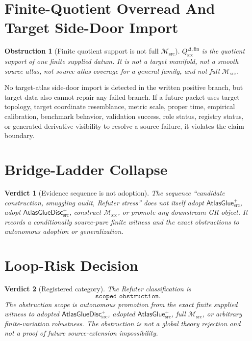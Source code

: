 \documentclass[11pt]{article}
\newcommand{\Msrc}{\mathcal{M}_{\mathrm{src}}}
\newcommand{\AtlasGlue}{\mathsf{AtlasGlue}_{\mathrm{src}}^{+}}
\newcommand{\AtlasGlueDisc}{\mathsf{AtlasGlueDisc}_{\mathrm{src}}^{+}}
\newcommand{\Qdisc}{Q_{\mathrm{src}}^{\Delta,\mathrm{fin}}}
\newtheorem{obstruction}{Obstruction}
\newtheorem{verdict}{Verdict}
\begin{document}
\section{Finite-Quotient Overread And Target Side-Door Import}

\begin{obstruction}[Finite quotient support is not full \(\Msrc\)]
\(\Qdisc\) is the quotient support of one finite supplied datum. It is not a
target manifold, not a smooth source atlas, not source-atlas coverage for a
general family, and not full \(\Msrc\).
\end{obstruction}

No target-atlas side-door import is detected in the written positive branch,
but target data also cannot repair any failed branch. If a future packet uses
target topology, target coordinate resemblance, metric scale, proper time,
empirical calibration, benchmark behavior, validation success, role status,
registry status, or generated derivative visibility to resolve a source
failure, it violates the claim boundary.

\section{Bridge-Ladder Collapse}

\begin{verdict}[Evidence sequence is not adoption]
The sequence ``candidate construction, smuggling audit, Refuter stress''
does not itself adopt \(\AtlasGlue\), adopt \(\AtlasGlueDisc\), construct
\(\Msrc\), or promote any downstream GR object. It records a conditionally
source-pure finite witness and the exact obstructions to autonomous adoption
or generalization.
\end{verdict}

\section{Loop-Risk Decision}

\begin{verdict}[Registered category]
The Refuter classification is
\[
  \texttt{scoped\_obstruction}.
\]
The obstruction scope is autonomous promotion from the exact finite supplied
witness to adopted \(\AtlasGlueDisc\), adopted \(\AtlasGlue\), full
\(\Msrc\), or arbitrary finite-variation robustness. The obstruction is not a
global theory rejection and not a proof of future source-extension
impossibility.
\end{verdict}
\end{document}
